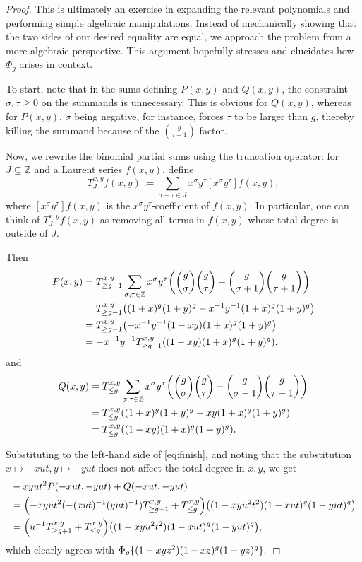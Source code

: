 \documentclass[11pt,reqno]{amsproc}
\numberwithin{equation}{section}
\theoremstyle{definition}
\theoremstyle{remark}
\newcommand\Z{{\mathbb Z}}
\newcommand\subeq{\subseteq}
\DeclarePairedDelimiter{\set}{\{}{\}}
\DeclarePairedDelimiter{\parens}{\lparen}{\rparen}
\begin{document}
\begin{proof}
    This is ultimately an exercise in expanding the relevant polynomials and performing simple algebraic manipulations. Instead of mechanically showing that the two sides of our desired equality are equal, we approach the problem from a more algebraic perspective. This argument hopefully stresses and elucidates how $\Phi_g$ arises in context. 

    To start, note that in the sums defining $P(x,y)$ and $Q(x,y)$, the constraint $\sigma,\tau\geq 0$ on the summands is unnecessary. This is obvious for $Q(x,y)$, whereas for $P(x,y)$, $\sigma$ being negative, for instance, forces $\tau$ to be larger than $g$, thereby killing the summand because of the $\binom{g}{\tau+1}$ factor.

    Now, we rewrite the binomial partial sums using the truncation operator: for $J\subeq \Z$ and a Laurent series $f(x,y)$, define
    \[ T^{x,y}_J f(x,y):=\sum_{\sigma+\tau\in J} x^\sigma y^\tau [x^\sigma y^\tau] f(x,y), \]
    where $[x^\sigma y^\tau]f(x,y)$ is the $x^\sigma y^\tau$-coefficient of $f(x,y)$. In particular, one can think of $T^{x,y}_Jf(x,y)$ as removing all terms in $f(x,y)$ whose total degree is outside of $J$.
    
    Then
    \begin{align*}
        P(x,y)&= T^{x,y}_{\geq g-1}\sum_{\sigma,\tau\in \Z} x^\sigma y^\tau \parens*{\binom{g}{\sigma}\binom{g}{\tau}-\binom{g}{\sigma+1}\binom{g}{\tau+1}} \\
        &= T^{x,y}_{\geq g-1} \parens*{(1+x)^g (1+y)^g - x^{-1}y^{-1}(1+x)^g (1+y)^g}\\
        &= T^{x,y}_{\geq g-1} \parens*{-x^{-1}y^{-1}(1-xy)(1+x)^g (1+y)^g}\\
        &= -x^{-1}y^{-1} T^{x,y}_{\geq g+1} \parens*{(1-xy)(1+x)^g (1+y)^g},
    \end{align*}
    and
    \begin{align*}
        Q(x,y)&= T^{x,y}_{\leq g}\sum_{\sigma,\tau\in \Z}x^\sigma y^\tau \parens*{\binom{g}{\sigma}\binom{g}{\tau}-\binom{g}{\sigma-1}\binom{g}{\tau-1}}\\
        &= T^{x,y}_{\leq g} \parens*{(1+x)^g (1+y)^g-xy(1+x)^g(1+y)^g}\\
        &=T^{x,y}_{\leq g} \parens*{(1-xy)(1+x)^g (1+y)^g}.
    \end{align*}

    Substituting to the left-hand side of \eqref{eq:finish}, and noting that the substitution $x\mapsto -xut, y\mapsto -yut$ does not affect the total degree in $x,y$, we get
    \begin{align*}
        &-xyut^2 P(-xut,-yut)+Q(-xut,-yut) \\
        &= \parens*{-xyut^2 (-(xut)^{-1}(yut)^{-1}) T^{x,y}_{\geq g+1}+T^{x,y}_{\leq g}} \parens*{(1-xyu^2t^2)(1-xut)^g (1-yut)^g}\\
        &= \parens*{u^{-1} T^{x,y}_{\geq g+1}+T^{x,y}_{\leq g}} \parens*{(1-xyu^2t^2)(1-xut)^g (1-yut)^g},
    \end{align*}
    which clearly agrees with $\Phi_g\set{(1-xyz^2)(1-xz)^g(1-yz)^g}.$
\end{proof}
\end{document}
